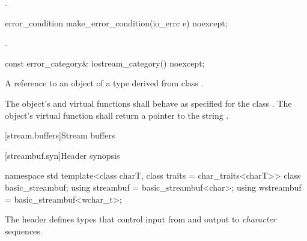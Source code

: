 \begin{itemdescr}
\pnum
\returns
{}.
\end{itemdescr}

\begin{indexed}{}
\begin{itemdecl}
error_condition make_error_condition(io_errc e) noexcept;
\end{itemdecl}
\end{indexed}

\begin{itemdescr}
\pnum
\returns
{}.
\end{itemdescr}

\begin{indexed}{}
\begin{itemdecl}
const error_category& iostream_category() noexcept;
\end{itemdecl}
\end{indexed}

\begin{itemdescr}
\pnum
\returns
A reference to an object of a type derived from class
.

\pnum
The object's  and  virtual functions shall behave as specified for the class . The object's  virtual function shall return a pointer to the string .
\end{itemdescr}


[stream.buffers]{Stream buffers}

[streambuf.syn]{Header  synopsis}

%
%
%
%
%
\begin{codeblock}
namespace std {
  template<class charT, class traits = char_traits<charT>>
    class basic_streambuf;
  using streambuf  = basic_streambuf<char>;
  using wstreambuf = basic_streambuf<wchar_t>;
}
\end{codeblock}

\pnum
The header 
defines types that control input from and output to
\textit{character} sequences.

